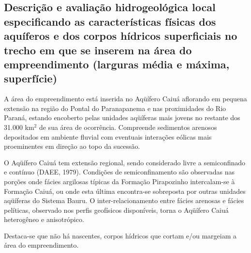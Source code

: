 \subsection{Descrição e avaliação hidrogeológica local especificando as características físicas dos aquíferos e dos corpos hídricos superficiais no trecho em que se inserem na área do empreendimento (larguras média e máxima, superfície)}

A  área do empreendimento está inserida no Aqüífero Caiuá aflorando em pequena extensão na região do Pontal do Paranapanema e nas proximidades do Rio Paraná, estando encoberto pelas unidades aqüíferas mais jovens no restante dos 31.000 km$^2$ de sua área de ocorrência. Compreende sedimentos arenosos depositados em ambiente fluvial com eventuais interações eólicas mais proeminentes em direção ao topo da sucessão.

O Aqüífero Caiuá tem extensão regional, sendo considerado livre a semiconfinado e contínuo (DAEE, 1979). Condições de semiconfinamento são observadas nas porções onde fácies argilosas típicas da Formação Pirapozinho intercalam-se à Formação Caiuá, ou onde esta última encontra-se sobreposta por outras unidades aqüíferas do Sistema Bauru. O inter-relacionamento entre fácies arenosas e fácies pelíticas, observado nos perfis geofísicos disponíveis, torna o Aqüífero Caiuá heterogêneo e anisotrópico.

Destaca-se que não há nascentes, corpos hídricos que cortam e/ou margeiam a área do empreendimento.
